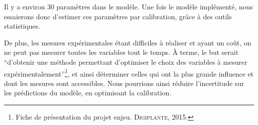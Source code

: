 Il y a environ 30 paramètres dans le modèle. Une fois le modèle implémenté, nous essaierons donc d'estimer ces paramètres par calibration,
grâce à des outils statistiques.

De plus, les mesures expérimentales étant difficiles à réaliser 
et ayant un coût, on ne peut pas mesurer toutes les variables tout le temps. 
À terme, le but serait \enquote{d'obtenir une méthode permettant d'optimiser
le choix des variables à mesurer 
expérimentalement}\footnote{Fiche de présentation du projet enjeu.
\textsc{Digiplante}, 2015.},
et ainsi déterminer celles qui ont la plus grande influence 
et dont les mesures sont accessibles. 
Nous pourrions ainsi réduire l'incertitude sur les prédictions du modèle,
en optimisant la calibration.






